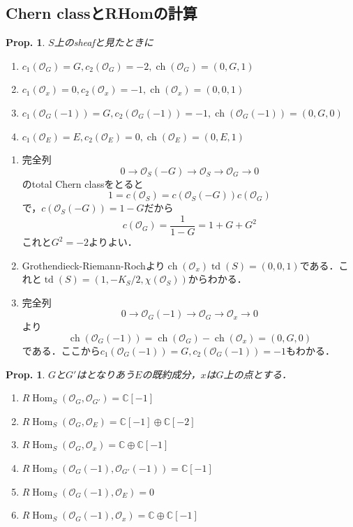 \documentclass[uplatex,a4paper,11pt,dvipdfmx]{jsarticle}
\makeatletter
\theoremstyle{mystyle} %
\newtheorem{proposition}[theorem]{Prop.}
\renewenvironment{proof}[1][\proofname]{\par
 \pushQED{\qed}%
 \normalfont \topsep6\p@\@plus6\p@\relax
 \trivlist
 \item[\hskip\labelsep
 \itshape
 {\bf\underline{#1}}]\ignorespaces
}{%
 \popQED\endtrivlist\@endpefalse
}
\DeclareMathOperator{\Hom}{Hom}
\DeclareMathOperator{\ch}{ch}
\DeclareMathOperator{\td}{td}
\makeatother
\begin{document}
\subsection{Chern classとRHomの計算}
\begin{proposition}
	$S$上のsheafと見たときに
	\begin{enumerate}
		\item $c_1(\mathcal{O}_G) = G, c_2(\mathcal{O}_G) = -2, \ch(\mathcal{O}_G) = (0, G, 1)$

		\item $c_1(\mathcal{O}_x) = 0, c_2(\mathcal{O}_x) = -1, \ch(\mathcal{O}_x) = (0, 0, 1)$
		\item $c_1(\mathcal{O}_G(-1)) = G, c_2(\mathcal{O}_G(-1)) = -1, \ch(\mathcal{O}_G(-1)) = (0, G, 0)$
		\item $c_1(\mathcal{O}_E) = E, c_2(\mathcal{O}_E) = 0, \ch(\mathcal{O}_E) = (0, E, 1)$
	\end{enumerate}
\end{proposition}
\begin{proof}
	\begin{enumerate}
		\item 完全列$$0 \to \mathcal{O}_S(-G) \to \mathcal{O}_S \to \mathcal{O}_G \to 0$$のtotal Chern classをとると$$1 = c(\mathcal{O}_S) = c(\mathcal{O}_S(-G))c(\mathcal{O}_G)$$で，$c(\mathcal{O}_S(-G)) = 1-G$だから$$c(\mathcal{O}_G) = \frac{1}{1-G} = 1+G+G^2$$これと$G^2=-2$よりよい．

		\item Grothendieck-Riemann-Rochより$\ch(\mathcal{O}_x)\td(S) = (0, 0, 1)$である．これと$\td(S) = (1, -K_S/2, \chi(\mathcal{O}_S))$からわかる．
		\item 完全列$$0 \to \mathcal{O}_G(-1) \to \mathcal{O}_G \to \mathcal{O}_x \to 0$$より$$\ch( \mathcal{O}_G(-1)) = \ch(\mathcal{O}_G) - \ch(\mathcal{O}_x) = (0, G, 0)$$である．ここから$c_1(\mathcal{O}_G(-1)) = G, c_2(\mathcal{O}_G(-1)) = -1$もわかる．
	\end{enumerate}
\end{proof}
\begin{proposition}
	$G$と$G'$はとなりあう$E$の既約成分，$x$は$G$上の点とする．
	\begin{enumerate}
		\item $R\Hom_S(\mathcal{O}_G, \mathcal{O}_{G'}) = \mathbb{C}[-1]$
		\item $R\Hom_S(\mathcal{O}_G, \mathcal{O}_E) = \mathbb{C}[-1]\oplus\mathbb{C}[-2]$
		\item $R\Hom_S(\mathcal{O}_G, \mathcal{O}_x) = \mathbb{C}\oplus\mathbb{C}[-1]$
		\item $R\Hom_S(\mathcal{O}_G(-1), \mathcal{O}_{G'}(-1)) = \mathbb{C}[-1]$
		\item $R\Hom_S(\mathcal{O}_G(-1), \mathcal{O}_E) = 0$
		\item $R\Hom_S(\mathcal{O}_G(-1), \mathcal{O}_x) = \mathbb{C}\oplus\mathbb{C}[-1]$
	\end{enumerate}
\end{proposition}
\end{document}

